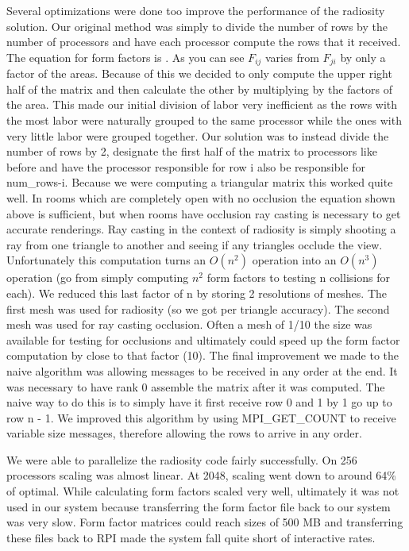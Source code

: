 Several optimizations were done too improve the performance of the radiosity solution.
Our original method was simply to divide the number of rows by the number of processors and have each processor compute the rows that it received.  
  The equation for form factors is .  As you can see $F_{ij}$ varies from $F_{ji}$ by only a factor of the areas.  Because of this we decided to only compute the upper right half of the matrix and then calculate the other by multiplying by the factors of the area.  This 
  made our initial division of labor very inefficient as the rows with the most labor were naturally grouped to the same processor while the ones with very little labor were grouped together.  Our solution was to instead divide the number of rows by 2, designate the first half of the matrix to processors like before and have the processor responsible for row i also be responsible for num\_rows-i.  Because we were computing a triangular matrix this worked quite well.  In rooms which are completely open with no occlusion the equation shown above is sufficient, but when rooms have occlusion ray casting is necessary to get accurate renderings.  Ray casting in the context of radiosity is simply shooting a ray from one triangle to another and seeing if any triangles occlude the view.  Unfortunately this computation turns an $O(n^2)$ operation into an $O(n^3)$ operation (go from simply computing $n^2$ form factors to testing n collisions for each).  We reduced this last factor of n by storing 2 resolutions of meshes.  The first mesh was used for radiosity (so we got per triangle accuracy).  The second mesh was used for ray casting occlusion.  Often a mesh of 1/10 the size was available for testing for occlusions and ultimately could speed up the form factor computation by close to that factor (10).  The final improvement we made to the naive algorithm was allowing messages to be received in any order at the end.  It was necessary to have rank 0 assemble the matrix after it was computed.  The naive way to do this is to simply have it first receive row 0 and 1 by 1 go up to row n - 1.  We improved this algorithm by using MPI\_GET\_COUNT to receive variable size messages, therefore allowing the rows to arrive in any order.
 
 We were able to parallelize the radiosity code fairly successfully.  On 256 processors scaling was almost linear.  At 2048, scaling went down to around 64\% of optimal.  While calculating form factors scaled very well, ultimately it was not used in our system because transferring the form factor file back to our system was very slow.   Form factor matrices could reach sizes of 500 MB and transferring these files back to RPI made the system fall quite short of interactive rates.
